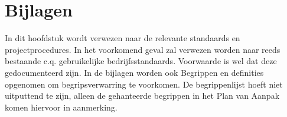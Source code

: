 \section{Bijlagen}

In dit hoofdstuk wordt verwezen naar de relevante standaards en projectprocedures.
In het voorkomend geval zal verwezen worden naar reeds bestaande c.q. gebruikelijke bedrijfsstandaards.
Voorwaarde is wel dat deze gedocumenteerd zijn.
In de bijlagen worden ook Begrippen en definities opgenomen om begripsverwarring te voorkomen.
De begrippenlijst hoeft niet uitputtend te zijn, alleen de gehanteerde begrippen in het Plan van Aanpak komen hiervoor in aanmerking.

